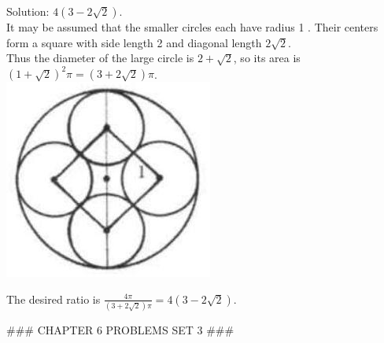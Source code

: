 \documentclass[10pt]{article}
\begin{document}
Solution: \(4(3-2 \sqrt{2})\).\\
It may be assumed that the smaller circles each have radius 1 . Their centers form a square with side length 2 and diagonal length \(2 \sqrt{2}\).\\
Thus the diameter of the large circle is \(2+\sqrt{2}\), so its area is \((1+\sqrt{2})^{2} \pi=(3+2 \sqrt{2}) \pi\).\\
\includegraphics[max width=\textwidth, center]{2025_04_17_97bc1f7e44d93c271a88g-182(2)}


The desired ratio is \(\frac{4 \pi}{(3+2 \sqrt{2}) \pi}=4(3-2 \sqrt{2})\).


### CHAPTER 6 PROBLEMS SET 3 ###
\end{document}
